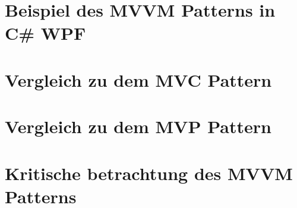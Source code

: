 \documentclass[titlepage=false,12pt]{scrreprt}
\begin{document}
\chapter{Beispiel des MVVM Patterns in C\# WPF}

\chapter{Vergleich zu dem MVC Pattern}

\chapter{Vergleich zu dem MVP Pattern}

\chapter{Kritische betrachtung des MVVM Patterns}
\end{document}
